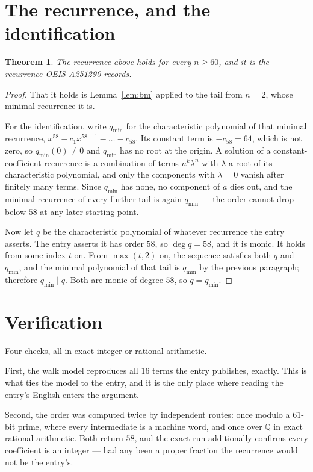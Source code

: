 \documentclass[11pt,a4paper]{article}
\theoremstyle{plain}
\newtheorem{theorem}{Theorem}
\theoremstyle{definition}
\begin{document}
\section{The recurrence, and the identification}

\begin{theorem}
The recurrence above holds for every $n\ge60$, and it is the recurrence OEIS A251290 records.
\end{theorem}

\begin{proof}
That it holds is Lemma~\ref{lem:bm} applied to the tail from $n=2$, whose minimal
recurrence it is.

For the identification, write $q_{\min}$ for the characteristic polynomial of that minimal
recurrence, $x^{58}-c_1x^{58-1}-\dots-c_{58}$. Its constant term is
$-c_{58}=64$, which is not zero, so $q_{\min}(0)\neq0$ and $q_{\min}$ has no
root at the origin. A solution of a constant-coefficient recurrence is a combination of terms
$n^{k}\lambda^{n}$ with $\lambda$ a root of its characteristic polynomial, and only the
components with $\lambda=0$ vanish after finitely many terms. Since $q_{\min}$ has none, no
component of $a$ dies out, and the minimal recurrence of every further tail is again
$q_{\min}$ --- the order cannot drop below $58$ at any later starting point.

Now let $q$ be the characteristic polynomial of whatever recurrence the entry asserts. The
entry asserts it has order $58$, so $\deg q=58$, and it is monic. It holds from some
index $t$ on. From $\max(t,2)$ on, the sequence satisfies both $q$ and $q_{\min}$, and
the minimal polynomial of that tail is $q_{\min}$ by the previous paragraph; therefore
$q_{\min}\mid q$. Both are monic of degree $58$, so $q=q_{\min}$.
\end{proof}

\section{Verification}

Four checks, all in exact integer or rational arithmetic.

First, the walk model reproduces all $16$ terms the entry publishes, exactly. This is
what ties the model to the entry, and it is the only place where reading the entry's English
enters the argument.

Second, the order was computed twice by independent routes: once modulo a $61$-bit prime, where
every intermediate is a machine word, and once over $\mathbb{Q}$ in exact rational arithmetic.
Both return $58$, and the exact run additionally confirms every coefficient is an integer
--- had any been a proper fraction the recurrence would not be the entry's.
\end{document}
